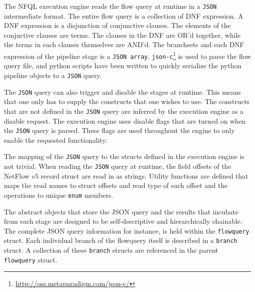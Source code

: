 The \ac{NFQL} execution engine reads the flow query at runtime in a
\texttt{JSON} intermediate format. The entire flow query is a collection of
\ac{DNF} expression. A \ac{DNF} expression is a disjunction of conjunctive
clauses. The elements of the conjuctive clauses are terms. The clauses in the
\ac{DNF} are OR'd together, while the terms in each clauses themselves are
AND'd. The branchsets and each \ac{DNF} expression of the pipeline stage is a
\texttt{JSON array}. \texttt{json-c}\footnote{\url{http://oss.metaparadigm.com/json-c/}} is used to
parse the flow query file, and python scripts have been written to quickly
serialize the python pipeline objects to a \texttt{JSON} query.

The \texttt{JSON} query can also trigger and disable the stages at runtime.
This means that one only has to supply the constructs that one wishes to use.
The constructs that are not defined in the \texttt{JSON} query are inferred by
the execution engine as a disable request. The execution engine uses disable
flags that are turned on when the \texttt{JSON} query is parsed. These flags
are used throughout the engine to only enable the requested functionality.

The mapping of the \texttt{JSON} query to the structs defined in the execution
engine is not trivial. When reading the \texttt{JSON} query at runtime, the
field offsets of the NetFlow $v5$ record struct are read in as strings.
Utility functions are defined that maps the read names to struct offsets and
read type of each offset and the operations to unique \texttt{enum} members.

The abstract objects that store the JSON query and the results that incubate
from each stage are designed to be self-descriptive and hierarchically
chainable. The complete JSON query information for instance, is held within
the \texttt{flowquery} struct. Each individual branch of the flowquery itself
is described in a \texttt{branch} struct. A collection of these
\texttt{branch} structs are referenced in the parent \texttt{flowquery}
struct.
